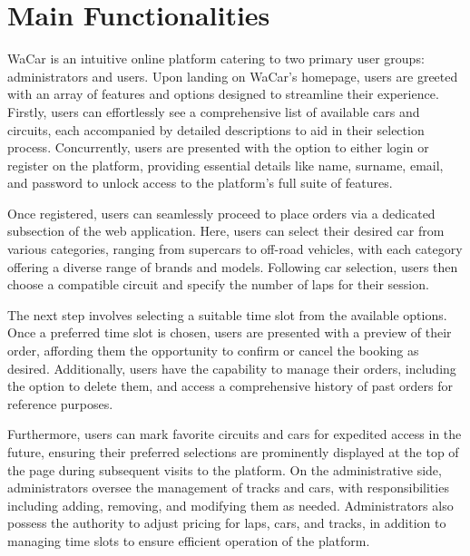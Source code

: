 \section{Main Functionalities}


WaCar is an intuitive online platform catering to two primary user groups: administrators and users. Upon landing on WaCar's homepage, users are greeted with an array of features and options designed to streamline their experience. Firstly, users can effortlessly see a comprehensive list of available cars and circuits, each accompanied by detailed descriptions to aid in their selection process. Concurrently, users are presented with the option to either login or register on the platform, providing essential details like name, surname, email, and password to unlock access to the platform's full suite of features.

Once registered, users can seamlessly proceed to place orders via a dedicated subsection of the web application. Here, users can select their desired car from various categories, ranging from supercars to off-road vehicles, with each category offering a diverse range of brands and models. Following car selection, users then choose a compatible circuit and specify the number of laps for their session.

The next step involves selecting a suitable time slot from the available options. Once a preferred time slot is chosen, users are presented with a preview of their order, affording them the opportunity to confirm or cancel the booking as desired. Additionally, users have the capability to manage their orders, including the option to delete them, and access a comprehensive history of past orders for reference purposes.

Furthermore, users can mark favorite circuits and cars for expedited access in the future, ensuring their preferred selections are prominently displayed at the top of the page during subsequent visits to the platform. On the administrative side, administrators oversee the management of tracks and cars, with responsibilities including adding, removing, and modifying them as needed. Administrators also possess the authority to adjust pricing for laps, cars, and tracks, in addition to managing time slots to ensure efficient operation of the platform.
